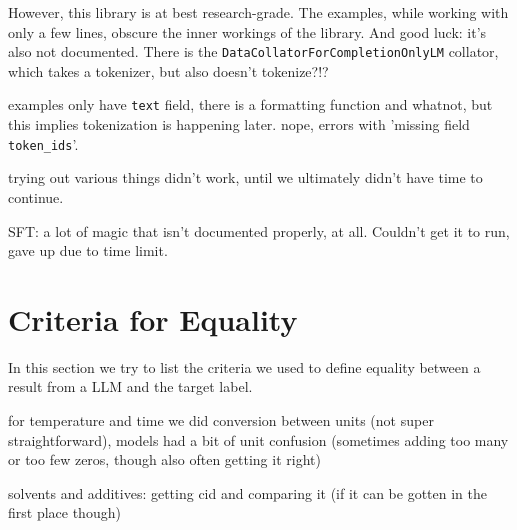 However, this library is at best research-grade. The examples, while working with only a few lines, obscure the inner workings of the library.
And good luck: it's also not documented. There is the \verb`DataCollatorForCompletionOnlyLM` collator, which takes a tokenizer, but also doesn't tokenize?!?

examples only have \verb`text` field, there is a formatting function and whatnot, but this implies tokenization is happening later. nope, errors with 'missing field \verb`token_ids`'.

trying out various things didn't work, until we ultimately didn't have time to continue.

SFT: a lot of magic that isn't documented properly, at all. Couldn't get it to run, gave up due to time limit.


\section{Criteria for Equality}\label{sec:equality}
In this section we try to list the criteria we used to define equality between a result from a \gls{LLM} and the target label.

for temperature and time we did conversion between units (not super straightforward), models had a bit of unit confusion
(sometimes adding too many or too few zeros, though also often getting it right)

solvents and additives: getting cid and comparing it (if it can be gotten in the first place though)

